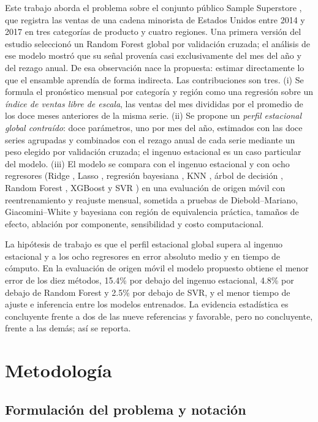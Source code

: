 \documentclass[pdflatex,sn-mathphys-num]{sn-jnl}
\begin{document}
Este trabajo aborda el problema sobre el conjunto público Sample Superstore \cite{superstore}, que registra las ventas de una cadena minorista de Estados Unidos entre 2014 y 2017 en tres categorías de producto y cuatro regiones. Una primera versión del estudio seleccionó un Random Forest global por validación cruzada; el análisis de ese modelo mostró que su señal provenía casi exclusivamente del mes del año y del rezago anual. De esa observación nace la propuesta: estimar directamente lo que el ensamble aprendía de forma indirecta. Las contribuciones son tres. (i) Se formula el pronóstico mensual por categoría y región como una regresión sobre un \emph{índice de ventas libre de escala}, las ventas del mes divididas por el promedio de los doce meses anteriores de la misma serie. (ii) Se propone un \emph{perfil estacional global contraído}: doce parámetros, uno por mes del año, estimados con las doce series agrupadas y combinados con el rezago anual de cada serie mediante un peso elegido por validación cruzada; el ingenuo estacional es un caso particular del modelo. (iii) El modelo se compara con el ingenuo estacional y con ocho regresores (Ridge \cite{hoerl1970}, Lasso \cite{tibshirani1996}, regresión bayesiana \cite{mackay1992}, KNN \cite{cover1967}, árbol de decisión \cite{breiman1984}, Random Forest \cite{breiman2001}, XGBoost \cite{chen2016} y SVR \cite{drucker1997}) en una evaluación de origen móvil con reentrenamiento y reajuste mensual, sometida a pruebas de Diebold--Mariano, Giacomini--White y bayesiana con región de equivalencia práctica, tamaños de efecto, ablación por componente, sensibilidad y costo computacional.

La hipótesis de trabajo es que el perfil estacional global supera al ingenuo estacional y a los ocho regresores en error absoluto medio y en tiempo de cómputo. En la evaluación de origen móvil el modelo propuesto obtiene el menor error de los diez métodos, 15.4\% por debajo del ingenuo estacional, 4.8\% por debajo de Random Forest y 2.5\% por debajo de SVR, y el menor tiempo de ajuste e inferencia entre los modelos entrenados. La evidencia estadística es concluyente frente a dos de las nueve referencias y favorable, pero no concluyente, frente a las demás; así se reporta.

\section{Metodología}\label{sec:metodologia}

\subsection{Formulación del problema y notación}\label{subsec:formulacion}
\end{document}
